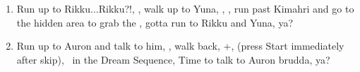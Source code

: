 \begin{enumerate}[resume]
    \item Run up to Rikku...Rikku?!, \sd, walk up to Yuna, \sd, \save, run past Kimahri and go to the hidden area to grab the , gotta run to Rikku and Yuna, ya?
    \item Run up to Auron and talk to him, \sd, walk back, \cs+\skippablefmv[1:00], (press Start immediately after skip), \sd\ in the Dream Sequence, Time to talk to Auron brudda, ya?
\end{enumerate}
\lossnp\bothcb\bothnpsingle